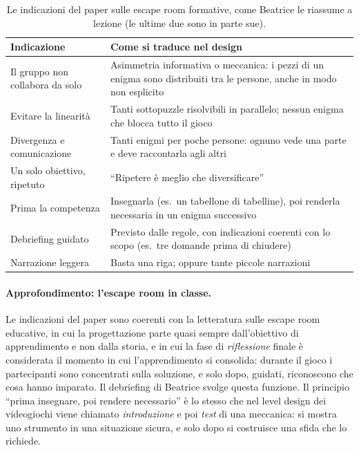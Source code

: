 \begin{table}[htbp]
\centering
\small
\begin{tabular}{@{}p{4.4cm}p{8.8cm}@{}}
\toprule
\textbf{Indicazione} & \textbf{Come si traduce nel design} \\
\midrule
Il gruppo non collabora da solo & Asimmetria informativa o meccanica: i pezzi di un
  enigma sono distribuiti tra le persone, anche in modo non esplicito \\
Evitare la linearità & Tanti sottopuzzle risolvibili in parallelo; nessun enigma che
  blocca tutto il gioco \\
Divergenza e comunicazione & Tanti enigmi per poche persone: ognuno vede una parte e
  deve raccontarla agli altri \\
Un solo obiettivo, ripetuto & ``Ripetere è meglio che diversificare'' \\
Prima la competenza & Insegnarla (es.\ un tabellone di tabelline), poi renderla
  necessaria in un enigma successivo \\
Debriefing guidato & Previsto dalle regole, con indicazioni coerenti con lo scopo
  (es.\ tre domande prima di chiudere) \\
Narrazione leggera & Basta una riga; oppure tante piccole narrazioni \\
\bottomrule
\end{tabular}
\caption{Le indicazioni del paper sulle escape room formative, come Beatrice le
riassume a lezione (le ultime due sono in parte sue).}
\label{a9:tab:paper}
\end{table}

\paragraph{Approfondimento: l'escape room in classe.} Le indicazioni del paper sono
coerenti con la letteratura sulle escape room educative, in cui la progettazione
parte quasi sempre dall'obiettivo di apprendimento e non dalla storia, e in cui la
fase di \emph{riflessione} finale è considerata il momento in cui l'apprendimento si
consolida: durante il gioco i partecipanti sono concentrati sulla soluzione, e solo
dopo, guidati, riconoscono che cosa hanno imparato. Il debriefing di Beatrice svolge
questa funzione. Il principio ``prima insegnare, poi rendere necessario'' è lo stesso
che nel level design dei videogiochi viene chiamato \emph{introduzione} e poi
\emph{test} di una meccanica: si mostra uno strumento in una situazione sicura, e solo
dopo si costruisce una sfida che lo richiede.

